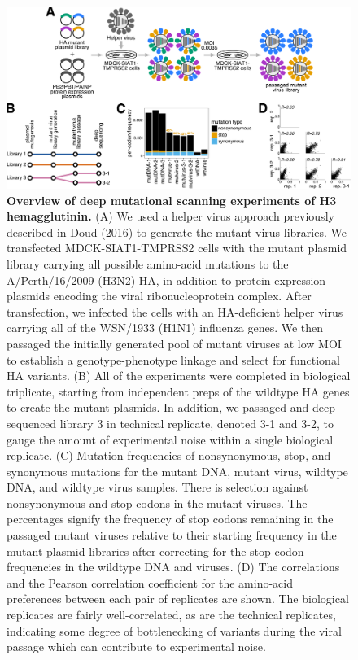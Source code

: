 \documentclass[11pt]{article}
\begin{document}
\begin{figure}
\centerline{\includegraphics[width=\textwidth]{figs/dms_overview/dms_overview.pdf}}
\caption{\label{fig:dms_overview}
{\bf Overview of deep mutational scanning experiments of H3 hemagglutinin.}
(A) We used a helper virus approach previously described in Doud (2016) to generate the mutant virus libraries. 
We transfected MDCK-SIAT1-TMPRSS2 cells with the mutant plasmid library carrying all possible amino-acid mutations to the A/Perth/16/2009 (H3N2) HA, in addition to protein expression plasmids encoding the viral ribonucleoprotein complex. 
After transfection, we infected the cells with an HA-deficient helper virus carrying all of the WSN/1933 (H1N1) influenza genes. 
We then passaged the initially generated pool of mutant viruses at low MOI to establish a genotype-phenotype linkage and select for functional HA variants. 
(B) All of the experiments were completed in biological triplicate, starting from independent preps of the wildtype HA genes to create the mutant plasmids. 
In addition, we passaged and deep sequenced library 3 in technical replicate, denoted 3-1 and 3-2, to gauge the amount of experimental noise within a single biological replicate.
(C) Mutation frequencies of nonsynonymous, stop, and synonymous mutations for the mutant DNA, mutant virus, wildtype DNA, and wildtype virus samples. 
There is selection against nonsynonymous and stop codons in the mutant viruses. 
The percentages signify the frequency of stop codons remaining in the passaged mutant viruses relative to their starting frequency in the mutant plasmid libraries after correcting for the stop codon frequencies in the wildtype DNA and viruses.
(D) The correlations and the Pearson correlation coefficient for the amino-acid preferences between each pair of replicates are shown. 
The biological replicates are fairly well-correlated, as are the technical replicates, indicating some degree of bottlenecking of variants during the viral passage which can contribute to experimental noise. 
}
\end{figure}
\end{document}
